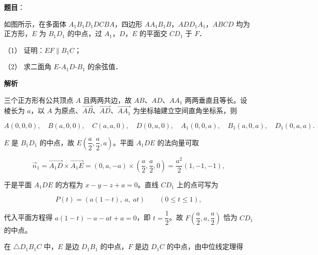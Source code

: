 \begin{answer}


\end{answer}
\begin{answer}

\textbf{题目}：

如图所示，在多面体 \(A_1B_1D_1DCBA\)，四边形 \(AA_1B_1B\)，\(ADD_1A_1\)，\(ABCD\) 均为正方形，\(E\) 为 \(B_1D_1\) 的中点，过 \(A_1\)，\(D\)，\(E\) 的平面交 \(CD_1\) 于 \(F\)．
\nopagebreak[4]
\begin{center}\end{center}
\nopagebreak[4]
（1） 证明：\(EF\parallel B_1C\)；

（2） 求二面角 \(E\text{-}A_1D\text{-}B_1\) 的余弦值．

\textbf{解析}

三个正方形有公共顶点 \(A\) 且两两共边，故 \(AB\)、\(AD\)、\(AA_1\) 两两垂直且等长。设棱长为 \(a\)，以 \(A\) 为原点、\(\overrightarrow{AB}\)、\(\overrightarrow{AD}\)、\(\overrightarrow{AA_1}\) 为坐标轴建立空间直角坐标系，则

\nopagebreak[4]
\[
A(0,0,0),\quad B(a,0,0),\quad C(a,a,0),\quad D(0,a,0),\quad A_1(0,0,a),\quad B_1(a,0,a),\quad D_1(0,a,a).
\]


\(E\) 是 \(B_1D_1\) 的中点，故 \(E\left(\dfrac{a}{2},\dfrac{a}{2},a\right)\)。平面 \(A_1DE\) 的法向量可取

\nopagebreak[4]
\[
\vec{n}_1=\overrightarrow{A_1D}\times\overrightarrow{A_1E}=(0,a,-a)\times\left(\dfrac{a}{2},\dfrac{a}{2},0\right)=\dfrac{a^2}{2}(1,-1,-1),
\]

于是平面 \(A_1DE\) 的方程为 \(x-y-z+a=0\)。直线 \(CD_1\) 上的点可写为

\nopagebreak[4]
\[
P(t)=\left(a(1-t),\ a,\ at\right)\qquad (0\leqslant t\leqslant 1),
\]

代入平面方程得 \(a(1-t)-a-at+a=0\)，即 \(t=\dfrac{1}{2}\)。故 \(F\left(\dfrac{a}{2},a,\dfrac{a}{2}\right)\) 恰为 \(CD_1\) 的中点。

在 \(\triangle D_1B_1C\) 中，\(E\) 是边 \(D_1B_1\) 的中点，\(F\) 是边 \(D_1C\) 的中点，由中位线定理得


\end{answer}
